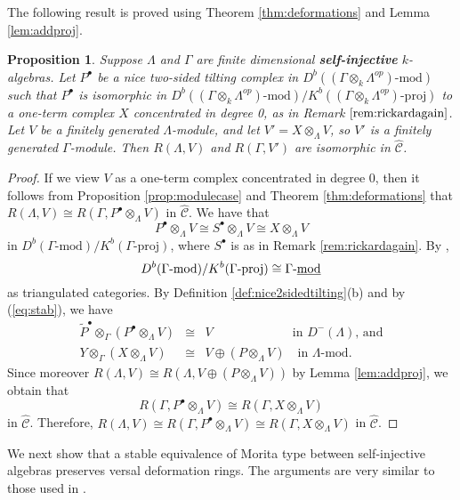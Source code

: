 \documentclass{amsart}
\theoremstyle{plain}
\newtheorem{prop}[thm]{Proposition}
\theoremstyle{definition}
\theoremstyle{remark}
\begin{document}
The following result is proved using Theorem \ref{thm:deformations} and
Lemma \ref{lem:addproj}.

\begin{prop}
\label{prop:stable1}
Suppose $\Lambda$ and $\Gamma$ are finite dimensional \textbf{self-injective} $k$-algebras.
Let $P^\bullet$ be a nice two-sided tilting complex in 
$D^b((\Gamma\otimes_k\Lambda^{op})\mbox{-$\mathrm{mod}$})$ such that $P^\bullet$ is isomorphic
in $D^b((\Gamma\otimes_k\Lambda^{op})\mbox{-$\mathrm{mod}$})/
K^{b}((\Gamma\otimes_k\Lambda^{op})\mbox{-$\mathrm{proj}$})$
to a one-term complex $X$ concentrated in degree 0, as in Remark $\ref{rem:rickardagain}$.
Let $V$ be a finitely generated $\Lambda$-module, and let ${V'} = X\otimes_\Lambda V$, so ${V'}$
is a finitely generated $\Gamma$-module. Then 
$R(\Lambda,V)$ and $R(\Gamma,{V'})$ are isomorphic in $\hat{\mathcal{C}}$.
\end{prop}

\begin{proof}
If we view $V$ as a one-term complex concentrated in degree 0, then it follows from
Proposition \ref{prop:modulecase} and Theorem \ref{thm:deformations} that $R(\Lambda,V)\cong
R(\Gamma,P^\bullet\otimes_\Lambda V)$ in $\hat{\mathcal{C}}$.
We have that 
$$P^\bullet\otimes_\Lambda V\cong S^\bullet\otimes_\Lambda V\cong X\otimes_\Lambda V$$
in $D^b(\Gamma\mbox{-{mod}})/K^{b}(\Gamma\mbox{-$\mathrm{proj}$})$, where $S^\bullet$ is as in
Remark \ref{rem:rickardagain}. By  \cite[Thm. 2.1]{rickardJPAA1989},
$$D^b(\Gamma\mbox{-{mod}})/K^{b}(\Gamma\mbox{-$\mathrm{proj}$})\cong \Gamma\mbox{-\underline{mod}}$$
as triangulated categories. 
By Definition \ref{def:nice2sidedtilting}(b) and by (\ref{eq:stab}), we have
\begin{eqnarray*}
\widetilde{P}^\bullet \otimes_{\Gamma}(P^\bullet\otimes_\Lambda V) &\cong& V\qquad\qquad\qquad\;\,
\mbox{in $D^-(\Lambda)$, and}\\
Y\otimes_\Gamma (X\otimes_\Lambda V) &\cong& V\oplus( P\otimes_\Lambda V)\quad
\mbox{in $\Lambda$-mod.}
\end{eqnarray*}
Since moreover $R(\Lambda,V)\cong R(\Lambda, V\oplus (P\otimes_\Lambda V))$ by Lemma 
\ref{lem:addproj}, we obtain that
$$R(\Gamma,P^\bullet\otimes_\Lambda V)\cong R(\Gamma,X\otimes_\Lambda V)$$
in $\hat{\mathcal{C}}$.
Therefore,
$R(\Lambda,V)\cong R(\Gamma,P^\bullet\otimes_\Lambda V)\cong R(\Gamma,X\otimes_\Lambda V)$
in $\hat{\mathcal{C}}$.
\end{proof}

We next show that a stable equivalence of Morita type between self-injective algebras
preserves versal deformation rings.
The arguments are very similar to those used in \cite[Sect. 2.2]{3sim}. 
\end{document}

